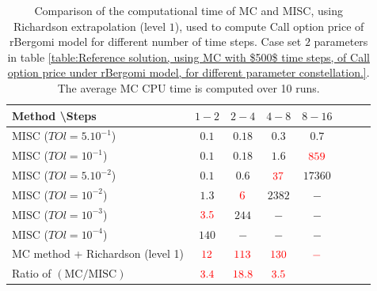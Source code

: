 \documentclass[11pt]{article}
\begin{document}
\begin{table}[h!]
	\centering
	\begin{tabular}{l*{6}{c}r}
		Method \textbackslash  Steps            & $1-2$ & $2-4$ & $4-8$ & $8-16$ &   \\
		\hline
		MISC ($TOl=5.10^{-1}$)  & $0.1$ & $0.18$ & $0.3$ & $0.7$  \\
		MISC ($TOl=10^{-1}$)  & $0.1$ & $0.18$ & $1.6$ & ${\color{red}859}$  \\
		MISC ($TOl=5.10^{-2}$)  & $0.1$ & $0.6$ & ${\color{red}37}$ & $17360$  \\
		MISC ($TOl=10^{-2}$)  & $1.3$ & ${\color{red}6}$ & $2382$ & $-$  \\
		MISC ($TOl=10^{-3}$)  & ${\color{red}3.5}$ & $ 244$ & $-$ & $-$  \\
		
			MISC ($TOl=10^{-4}$)  & $140$ & $-$ & $-$ & $-$  \\
		\hline	
		MC method + Richardson (level 1)  &${\color{red}12}$ & ${\color{red}113}$  & ${\color{red}130}$  & ${\color{red}-}$ \\
	
		\hline	
		Ratio of $\left(\text{MC}/ \text{MISC} \right)$  &$\red{ 3.4
		}$ & $\red{     18.8
		}$  & $\red{ 3.5}
		$  & $$ \\
		\hline
	\end{tabular}
	\caption{Comparison of the computational time of  MC and MISC, using Richardson extrapolation (level $1$), used to compute Call option price of rBergomi model for different number of time steps. Case set $2$ parameters in table \ref{table:Reference solution, using MC with $500$ time steps, of Call option price under rBergomi model, for different parameter constellation.}. The
average MC CPU time is computed over 10 runs.}
	\label{Comparsion of the computational time of  MC and MISC, using Richardson extrapolation (level $1$), used to compute Call option price of rBergomi model for different number of time steps. Case set $2$ parameters,linear}
\end{table}
\end{document}
